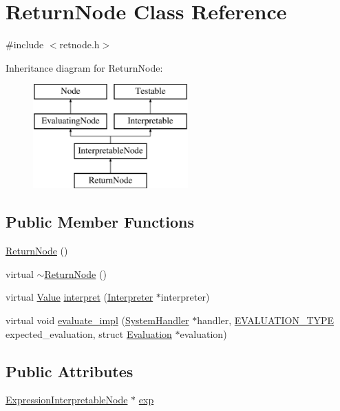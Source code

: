 \hypertarget{classReturnNode}{}\section{Return\+Node Class Reference}
\label{classReturnNode}


{\ttfamily \#include $<$retnode.\+h$>$}

Inheritance diagram for Return\+Node\+:\begin{figure}[H]
\begin{center}
\leavevmode
\includegraphics[height=4.000000cm]{classReturnNode}
\end{center}
\end{figure}
\subsection*{Public Member Functions}
\begin{DoxyCompactItemize}
\item 
\hyperlink{classReturnNode_a1e79c04a4e82c37af4aafa39be12b3ba}{Return\+Node} ()
\item 
virtual \hyperlink{classReturnNode_ab6ad8adf03f6c24bf9d717c6f1af7bcb}{$\sim$\+Return\+Node} ()
\item 
virtual \hyperlink{classValue}{Value} \hyperlink{classReturnNode_ae6c35829787a4f880b3ee1fa4b2e98d3}{interpret} (\hyperlink{classInterpreter}{Interpreter} $\ast$interpreter)
\item 
virtual void \hyperlink{classReturnNode_ac07545808632b52ec192cce2dd80b051}{evaluate\+\_\+impl} (\hyperlink{classSystemHandler}{System\+Handler} $\ast$handler, \hyperlink{statics_8h_a6664c451ca7787483a7981cc1de68dbb}{E\+V\+A\+L\+U\+A\+T\+I\+O\+N\+\_\+\+T\+Y\+PE} expected\+\_\+evaluation, struct \hyperlink{structEvaluation}{Evaluation} $\ast$evaluation)
\end{DoxyCompactItemize}
\subsection*{Public Attributes}
\begin{DoxyCompactItemize}
\item 
\hyperlink{classExpressionInterpretableNode}{Expression\+Interpretable\+Node} $\ast$ \hyperlink{classReturnNode_a27f21d586d90935184261ea34cf2a253}{exp}
\end{DoxyCompactItemize}
